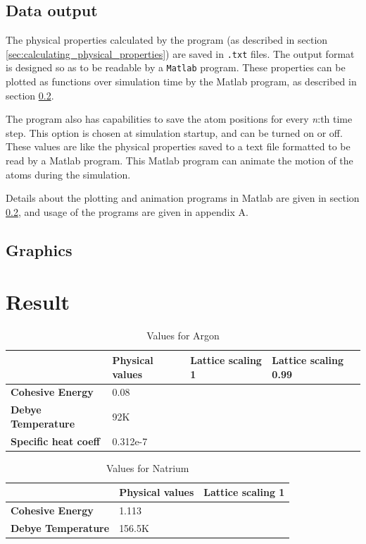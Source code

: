 \documentclass[12pt,a4paper]{article}
\begin{document}
\subsection{Data output}
\label{sec:data_output}
The physical properties calculated by the program (as described in section \ref{sec:calculating_physical_properties}) are saved in \texttt{.txt} files. The output format is designed so as to be readable by a \texttt{Matlab} program. These properties can be plotted as functions over simulation time by the Matlab program, as described in section \ref{sec:graphics}. 

The program also has capabilities to save the atom positions for every \emph{n}:th time step. This option is chosen at simulation startup, and can be turned on or off. These values are like the physical properties saved to a text file formatted to be read by a Matlab program. This Matlab program can animate the motion of the atoms during the simulation. 

Details about the plotting and animation programs in Matlab are given in section \ref{sec:graphics}, and usage of the programs are given in appendix A.

\subsection{Graphics}
\label{sec:graphics}


\newpage
\section{Result}
\label{sec:Result}

\begin{table}[h]
\caption{Values for Argon}
\begin{tabular}{| l | l | l | l |}
\hline
  & \textbf{Physical values} & \textbf{Lattice scaling 1} & \textbf{Lattice scaling 0.99} \\
\hline
\textbf{Cohesive Energy} & 0.08 &  &   \\
\hline
\textbf{Debye Temperature} & 92K &  &  \\
\hline
\textbf{Specific heat coeff} & 0.312e-7 &  & \\
\end{tabular}
\end{table}


\begin{table}[h]
\caption{Values for Natrium}
\begin{tabular}{| l | l | l |}
\hline
  & \textbf{Physical values} & \textbf{Lattice scaling 1} \\
\hline
\textbf{Cohesive Energy} & 1.113 &   \\
\hline
\textbf{Debye Temperature} & 156.5K &   \\
\hline
\end{tabular}
\end{table} 
\end{document}
